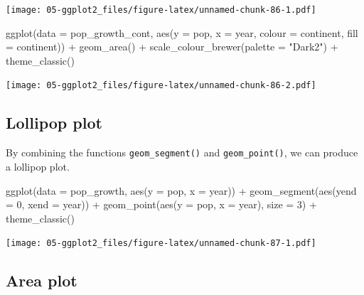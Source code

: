 \documentclass[
]{book}
\newenvironment{Shaded}{\begin{snugshade}}{\end{snugshade}}
\newcommand{\AttributeTok}[1]{\textcolor[rgb]{0.77,0.63,0.00}{#1}}
\newcommand{\DecValTok}[1]{\textcolor[rgb]{0.00,0.00,0.81}{#1}}
\newcommand{\FunctionTok}[1]{\textcolor[rgb]{0.00,0.00,0.00}{#1}}
\newcommand{\NormalTok}[1]{#1}
\newcommand{\SpecialCharTok}[1]{\textcolor[rgb]{0.00,0.00,0.00}{#1}}
\newcommand{\StringTok}[1]{\textcolor[rgb]{0.31,0.60,0.02}{#1}}
\begin{document}
\texttt{[image: 05-ggplot2\_files/figure-latex/unnamed-chunk-86-1.pdf]}

\begin{Shaded}
\begin{Highlighting}[]
\FunctionTok{ggplot}\NormalTok{(}\AttributeTok{data =}\NormalTok{ pop\_growth\_cont, }\FunctionTok{aes}\NormalTok{(}\AttributeTok{y =}\NormalTok{ pop, }\AttributeTok{x =}\NormalTok{ year, }\AttributeTok{colour =}\NormalTok{ continent, }\AttributeTok{fill =}\NormalTok{ continent)) }\SpecialCharTok{+} 
  \FunctionTok{geom\_area}\NormalTok{() }\SpecialCharTok{+} 
  \FunctionTok{scale\_colour\_brewer}\NormalTok{(}\AttributeTok{palette =} \StringTok{"Dark2"}\NormalTok{) }\SpecialCharTok{+}
  \FunctionTok{theme\_classic}\NormalTok{()}
\end{Highlighting}
\end{Shaded}

\texttt{[image: 05-ggplot2\_files/figure-latex/unnamed-chunk-86-2.pdf]}

\hypertarget{lollipop-plot}{%
\subsection{Lollipop plot}\label{lollipop-plot}}

By combining the functions \texttt{geom\_segment()} and \texttt{geom\_point()}, we can produce a lollipop plot.

\begin{Shaded}
\begin{Highlighting}[]
\FunctionTok{ggplot}\NormalTok{(}\AttributeTok{data =}\NormalTok{ pop\_growth, }\FunctionTok{aes}\NormalTok{(}\AttributeTok{y =}\NormalTok{ pop, }\AttributeTok{x =}\NormalTok{ year)) }\SpecialCharTok{+} 
  \FunctionTok{geom\_segment}\NormalTok{(}\FunctionTok{aes}\NormalTok{(}\AttributeTok{yend =} \DecValTok{0}\NormalTok{, }\AttributeTok{xend =}\NormalTok{ year)) }\SpecialCharTok{+}
  \FunctionTok{geom\_point}\NormalTok{(}\FunctionTok{aes}\NormalTok{(}\AttributeTok{y =}\NormalTok{ pop, }\AttributeTok{x =}\NormalTok{ year), }\AttributeTok{size =} \DecValTok{3}\NormalTok{) }\SpecialCharTok{+}
  \FunctionTok{theme\_classic}\NormalTok{()}
\end{Highlighting}
\end{Shaded}

\texttt{[image: 05-ggplot2\_files/figure-latex/unnamed-chunk-87-1.pdf]}

\hypertarget{area-plot}{%
\subsection{Area plot}\label{area-plot}}
\end{document}
